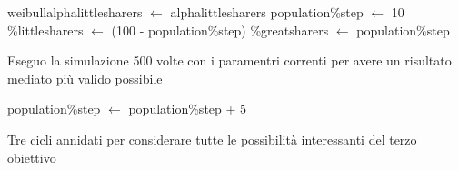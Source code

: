 \begin{algorithm}
 \begin{algorithmic}[1]
      \State weibull\smuscore alpha\smuscore little\smuscore sharers  $\gets$ alpha\smuscore little\smuscore sharers
	\State population\smuscore \%\smuscore step $\gets$ 10
	  \State \%\smuscore little\smuscore sharers  $\gets$  (100 - population\smuscore \%\smuscore step)
	  \State \%\smuscore great\smuscore sharers  $\gets$  population\smuscore \%\smuscore step
	  
	  
	    \Comment Eseguo la simulazione 500 volte con i paramentri correnti per avere un risultato mediato più valido possibile
	  
	  \EndFor
	  
	  \State population\smuscore \%\smuscore step $\gets$ population\smuscore \%\smuscore step + 5
	  
	\EndWhile
      \EndFor
    \EndProcedure
 \end{algorithmic}
 
 \caption{Tre cicli annidati per considerare tutte le possibilità interessanti del terzo obiettivo}
 \label{alg:third_test}
\end{algorithm}

